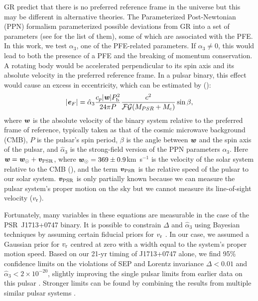 GR predict that there is no preferred reference frame in the universe but this may
be different in alternative theories. 
The Parameterized Post-Newtonian (PPN) formalism parameterized possible
deviations from GR into a set of parameters (see
\citealt{will14} for the list of them), some of which are associated with the
PFE. In this work, we test $\alpha_3$, one of the PFE-related parameters. 
If $\alpha_3 \neq 0$, this would lead to both
the presence of a PFE and the breaking of momentum conservation.
A rotating body would be accelerated perpendicular to its spin
axis and its absolute velocity in the preferred reference frame.
In a pulsar binary, this effect would cause an excess in eccentricity, which can be estimated by (\citealt{de92, bd96}):
\begin{equation}
|\textbf{\textit{e}}_F| = \hat{\alpha}_3 \frac{c_p|\textbf{\textit{w}}|P_{\rm b}^2}{24\pi P}
\frac{c^2}{\msF\msG (M_{PSR}+M_{\rm c})}\sin \beta,
\end{equation}
where $\textbf{\textit{w}}$ is the absolute velocity of the binary system
relative to the preferred frame of reference, typically taken as that of the cosmic microwave background (CMB), $P$ is the pulsar's spin period, $\beta$ is the
angle between $\textbf{\textit{w}}$ and the spin axis of the pulsar, and
$\hat{\alpha}_3$ is the strong-field version of the PPN parameters $\alpha_3$.
Here $\textbf{\textit{w}} = \textbf{\textit{w}}_{\odot} + \textbf{\textit{v}}_{\rm PSR}$, where
$\textbf{\textit{w}}_{\odot}=369\pm0.9$km~s$^{-1}$ is the velocity of
the solar system relative to the CMB (\citealt{hwh+09}),
and the term $\textbf{\textit{v}}_{\rm PSR}$ is the relative speed of the pulsar to our solar system. 
$\textbf{\textit{v}}_{\rm PSR}$ is only partially known because we can measure
the pulsar system's proper motion on the sky but we cannot measure its
line-of-sight velocity ($v_{\rm r}$).

Fortunately, many variables in these equations are measurable in the
case of the PSR~J1713+0747 binary. 
It is possible to constrain $\Delta$ and $\hat{\alpha}_3$ using Bayesian techniques 
by assuming certain fiducial priors for $v_{\rm r}$ \citep{sns+05, sfl+05, gsf+11}. 
In our case, we assumed a Gaussian prior for $v_{\rm r}$ centred at zero with
a width equal to the system's proper motion speed.
Based on our 21-yr 
timing of J1713+0747 alone, we find 95\% confidence limits on the violations of SEP and
Lorentz invariance $\Delta < 0.01$ and $\hat{\alpha}_3<2\times10^{-20}$, 
slightly improving the single pulsar limits from earlier data on this pulsar
\citep{sns+05, sfl+05, gsf+11}.
Stronger limits can be found by combining the results from
multiple similar pulsar systems \citep{wex00,sfl+05, gsf+11}.

